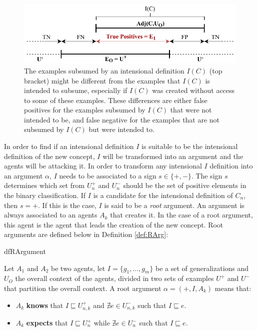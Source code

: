 \begin{figure}[t]
    \centering
    \includegraphics[width=\textwidth]{figs/Belief.pdf}
    \caption{The examples subsumed by an intensional definition $I(C)$ (top bracket) might be different from the examples that $I(C)$ is intended to subsume, especially if $I(C)$ was created without access to some of these examples. These differences are either false positives for the examples subsumed by $I(C)$ that were not intended to be, and false negative for the examples that are not subsumed by $I(C)$ but were intended to.}
    \label{fig:Belief}
\end{figure}

In order to find if an intensional definition $I$ is suitable to be the intensional definition of the new concept, $I$ will be transformed into an argument and the agents will be attacking it. In order to transform any intensional $I$ definition into an argument $\alpha$, $I$ needs to be associated to a sign $s \in \{+,-\}$. The sign $s$ determines which set from $U^{+}_{n}$ and $U^{-}_{n}$ should be the set of positive elements in the binary classification. If $I$ is a candidate for the intensional definition of $C_{n}$, then $s = +$. If this is the case, $I$ is said to be a \emph{root} argument. An argument is always associated to an agents $A_{k}$ that creates it. In the case of a root argument, this agent is the agent that leads the creation of the new concept. Root arguments are defined below in Definition \ref{def:RArg}:

\begin{restatable}{df}{RArgument}
\label{def:RArg}

Let $A_{1}$ and $A_{2}$ be two agents, let $I = \{ g_{1}, ..., g_{m} \}$ be a set of generalizations and  $U_{O}$ the overall context of the agents, divided in two sets of examples $U^{+}$ and $U^{-}$ that partition the overall context. A root argument $\alpha = (+,I,A_{k})$ means that:

\begin{itemize}
    \item $A_{k}$ \textbf{knows} that $I \sqsubseteq U^{+}_{n,k}$ and $\nexists e \in U^{-}_{n,k}$ such that $I \sqsubseteq e$.
    \item $A_{k}$ \textbf{expects} that $I \sqsubseteq U^{+}_{n}$ while $\nexists e \in U^{-}_{n}$ such that $I \sqsubseteq e$.
\end{itemize}

\end{restatable}

